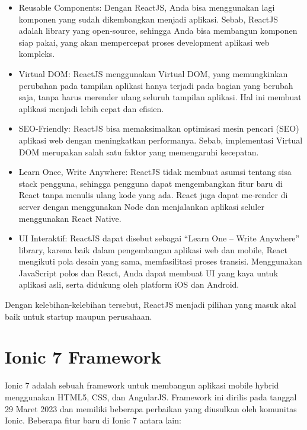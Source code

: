 \begin{itemize}
    \item Reusable Components: Dengan ReactJS, Anda bisa menggunakan lagi komponen yang sudah dikembangkan menjadi aplikasi. Sebab, ReactJS adalah library yang open-source, sehingga Anda bisa membangun komponen siap pakai, yang akan mempercepat proses development aplikasi web kompleks.
    \item Virtual DOM: ReactJS menggunakan Virtual DOM, yang memungkinkan perubahan pada tampilan aplikasi hanya terjadi pada bagian yang berubah saja, tanpa harus merender ulang seluruh tampilan aplikasi. Hal ini membuat aplikasi menjadi lebih cepat dan efisien.
    \item SEO-Friendly: ReactJS bisa memaksimalkan optimisasi mesin pencari (SEO) aplikasi web dengan meningkatkan performanya. Sebab, implementasi Virtual DOM merupakan salah satu faktor yang memengaruhi kecepatan.
    \item Learn Once, Write Anywhere: ReactJS tidak membuat asumsi tentang sisa stack pengguna, sehingga pengguna dapat mengembangkan fitur baru di React tanpa menulis ulang kode yang ada. React juga dapat me-render di server dengan menggunakan Node dan menjalankan aplikasi seluler menggunakan React Native.
    \item UI Interaktif: ReactJS dapat disebut sebagai “Learn One – Write Anywhere” library, karena baik dalam pengembangan aplikasi web dan mobile, React mengikuti pola desain yang sama, memfasilitasi proses transisi. Menggunakan JavaScript polos dan React, Anda dapat membuat UI yang kaya untuk aplikasi asli, serta didukung oleh platform iOS dan Android. 
\end{itemize}

Dengan kelebihan-kelebihan tersebut, ReactJS menjadi pilihan yang masuk akal baik untuk startup maupun perusahaan.

\section{Ionic 7 Framework}
\label{sec:template}
 
 

Ionic 7 adalah sebuah framework untuk membangun aplikasi mobile hybrid menggunakan HTML5, CSS, dan AngularJS. Framework ini dirilis pada tanggal 29 Maret 2023 dan memiliki beberapa perbaikan yang diusulkan oleh komunitas Ionic. Beberapa fitur baru di Ionic 7 antara lain:

